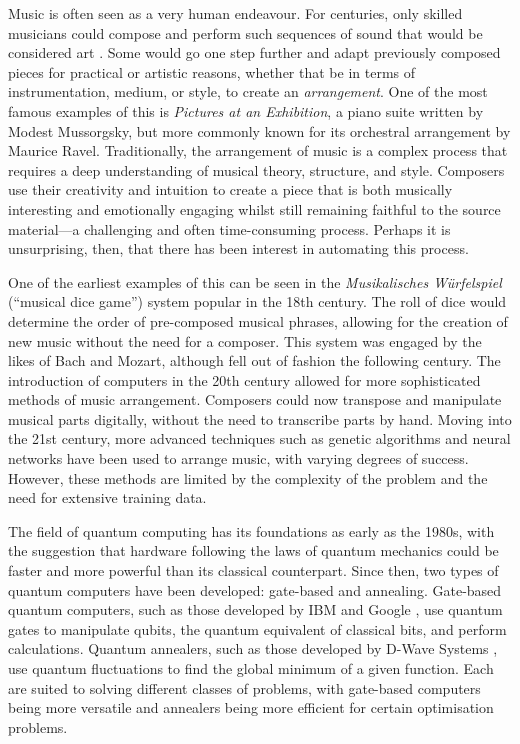 \documentclass[12pt]{article}
\begin{document}
Music is often seen as a very human endeavour. For centuries, only skilled musicians could compose and perform such sequences of sound that would be considered art \cite{dwave_manufactured_2011}. Some would go one step further and adapt previously composed pieces for practical or artistic reasons, whether that be in terms of instrumentation, medium, or style, to create an \textit{arrangement}. One of the most famous examples of this is \textit{Pictures at an Exhibition}, a piano suite written by Modest Mussorgsky, but more commonly known for its orchestral arrangement by Maurice Ravel.
Traditionally, the arrangement of music is a complex process that requires a deep understanding of musical theory, structure, and style. Composers use their creativity and intuition to create a piece that is both musically interesting and emotionally engaging whilst still remaining faithful to the source material—a challenging and often time-consuming process. Perhaps it is unsurprising, then, that there has been interest in automating this process.

One of the earliest examples of this can be seen in the \textit{Musikalisches Würfelspiel} (``musical dice game'') system popular in the 18th century. The roll of dice would determine the order of pre-composed musical phrases, allowing for the creation of new music without the need for a composer. This system was engaged by the likes of Bach and Mozart, although fell out of fashion the following century.
The introduction of computers in the 20th century allowed for more sophisticated methods of music arrangement. Composers could now transpose and manipulate musical parts digitally, without the need to transcribe parts by hand. Moving into the 21st century, more advanced techniques such as genetic algorithms and neural networks have been used to arrange music, with varying degrees of success. However, these methods are limited by the complexity of the problem and the need for extensive training data.

The field of quantum computing has its foundations as early as the 1980s, with the suggestion that hardware following the laws of quantum mechanics could be faster and more powerful than its classical counterpart. Since then, two types of quantum computers have been developed: gate-based and annealing. Gate-based quantum computers, such as those developed by IBM  and Google , use quantum gates to manipulate qubits, the quantum equivalent of classical bits, and perform calculations. Quantum annealers, such as those developed by D-Wave Systems , use quantum fluctuations to find the global minimum of a given function. Each are suited to solving different classes of problems, with gate-based computers being more versatile and annealers being more efficient for certain optimisation problems. 
\end{document}
